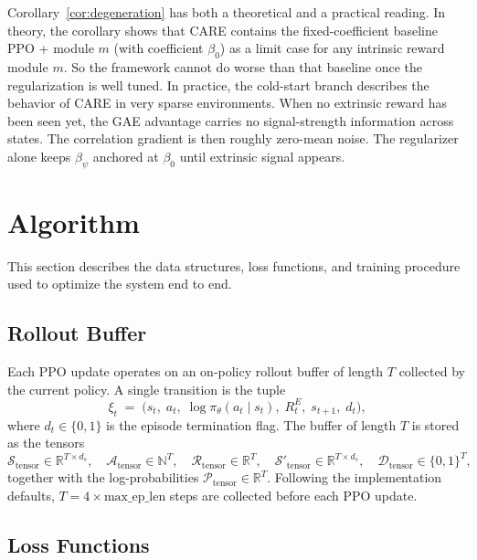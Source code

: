 Corollary~\ref{cor:degeneration} has both a theoretical and a practical reading. In theory, the corollary shows that CARE contains the fixed-coefficient baseline PPO + module $m$ (with coefficient $\beta_0$) as a limit case for any intrinsic reward module $m$. So the framework cannot do worse than that baseline once the regularization is well tuned. In practice, the cold-start branch describes the behavior of CARE in very sparse environments. When no extrinsic reward has been seen yet, the GAE advantage carries no signal-strength information across states. The correlation gradient is then roughly zero-mean noise. The regularizer alone keeps $\beta_\psi$ anchored at $\beta_0$ until extrinsic signal appears.

\section{Algorithm}
\label{sec:algorithm}

This section describes the data structures, loss functions, and training procedure used to optimize the system end to end.

\subsection{Rollout Buffer}
\label{sec:rollout_buffer}

Each PPO update operates on an on-policy rollout buffer of length $T$ collected by the current policy. A single transition is the tuple
\begin{equation}
\xi_t \;=\; \bigl( s_t,\; a_t,\; \log \pi_\theta(a_t \mid s_t),\; R_t^E,\; s_{t+1},\; d_t \bigr),
\label{eq:transition_tuple}
\end{equation}
where $d_t \in \{0, 1\}$ is the episode termination flag. The buffer of length $T$ is stored as the tensors
\begin{equation*}
\mathcal{S}_\text{tensor} \in \mathbb{R}^{T \times d_s}, \quad
\mathcal{A}_\text{tensor} \in \mathbb{N}^{T}, \quad
\mathcal{R}_\text{tensor} \in \mathbb{R}^{T}, \quad
\mathcal{S}'_\text{tensor} \in \mathbb{R}^{T \times d_s}, \quad
\mathcal{D}_\text{tensor} \in \{0,1\}^{T},
\end{equation*}
together with the log-probabilities $\mathcal{P}_\text{tensor} \in \mathbb{R}^{T}$. Following the implementation defaults, $T = 4 \times \text{max\_ep\_len}$ steps are collected before each PPO update.

\subsection{Loss Functions}
\label{sec:loss_functions}

